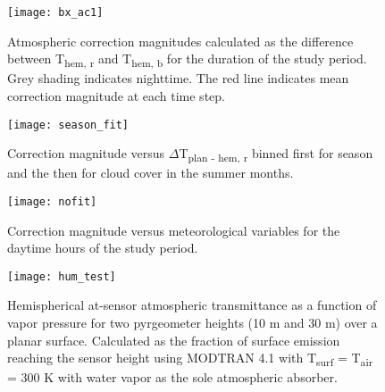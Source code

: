 \begin{figure}[H]
	\centering
	\texttt{[image: bx\_ac1]}
	\caption{Atmospheric correction magnitudes calculated as the difference between T\textsubscript{hem, r} and T\textsubscript{hem, b} for the duration of the study period. Grey shading indicates nighttime. The red line indicates mean correction magnitude at each time step.}
	\label{bx_ac}
\end{figure}

\begin{figure}[H]
	\centering
	\texttt{[image: season\_fit]}
	\caption{Correction magnitude versus $\Delta$T\textsubscript{plan - hem, r} binned first for season and the then for cloud cover in the summer months.}
	\label{season_fit}
\end{figure}

\begin{figure}[H]
	\centering
	\texttt{[image: nofit]}
	\caption{Correction magnitude versus meteorological variables for the daytime hours of the study period.}
	\label{nofit}
\end{figure}

\begin{figure}[H]
	\centering
	\texttt{[image: hum\_test]}
	\caption{Hemispherical at-sensor atmospheric transmittance as a function of vapor pressure for two pyrgeometer heights (10 \si{\meter} and 30 \si{\meter}) over a planar surface. Calculated as the fraction of surface emission reaching the sensor height using MODTRAN 4.1 with T\textsubscript{surf} = T\textsubscript{air} = 300 \si{\kelvin} with water vapor as the sole atmospheric absorber.}
	\label{humtest}
\end{figure}


